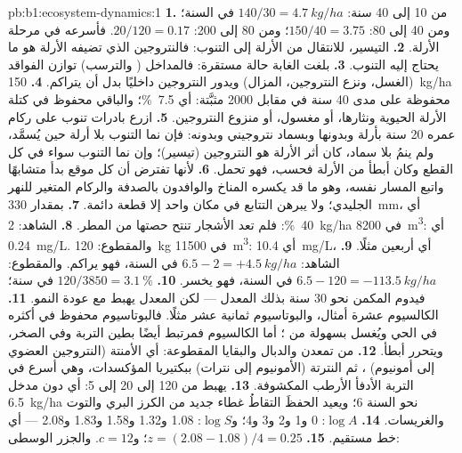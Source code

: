\begin{solution}{pb:b1:ecosystem-dynamics:1}
\textbf{1.} من 10 إلى 40 سنة: $140/30 = \qty{4.7}{kg/ha}$ في السنة؛ ومن 40 إلى 80:
$150/40 = \num{3.75}$؛ ومن 80 إلى 200: $20/120 = \num{0.17}$. فأسرعه في
مرحلة الأرلة.
\textbf{2.} التيسير، للانتقال من الأرلة إلى التنوب: فالنتروجين الذي
تضيفه الأرلة هو ما يحتاج إليه التنوب.
\textbf{3.} بلغت الغابة حالة مستقرة: فالمداخل (
والترسب) توازن الفواقد (الغسل، ونزع النتروجين، 
المزال) ويدور النتروجين داخليًا بدل أن يتراكم.
\textbf{4.} \qty{150}{kg/ha} محفوظة على مدى 40 سنة في مقابل
\num{2000} مثبَّتة: أي \qty{7.5}{\%}؛ والباقي محفوظ في كتلة الأرلة
الحيوية ونثارها، أو مغسول، أو منزوع النتروجين.
\textbf{5.} ازرع بادرات تنوب على ركام عمره 20 سنة بأرلة وبدونها
وبسماد نتروجيني وبدونه: فإن نما التنوب
بلا أرلة حين يُسمَّد، ولم ينمُ بلا سماد، كان
أثر الأرلة هو النتروجين (تيسير)؛ وإن نما التنوب سواء
في كل القطع وكان أبطأ من الأرلة فحسب، فهو تحمل.
\textbf{6.} لأنها تفترض أن كل موقع بدأ متشابهًا واتبع المسار
نفسه، وهو ما قد يكسره المناخ والوافدون بالصدفة والركام المتغير
للنهر الجليدي؛ ولا يبرهن التتابع في مكان واحد إلا قطعة دائمة.
\textbf{7.} بمقدار \qty{330}{mm}، أي \qty{40}{\%}: فلم تعد الأشجار
تنتح حصتها من المطر.
\textbf{8.} الشاهد: \qty{2}{kg/ha} في \qty{8200}{m^3}: أي \qty{0.24}{mg/L}.
والمقطوع: \qty{120}{kg} في \qty{11500}{m^3}: أي \qty{10.4}{mg/L}، أي أربعين
مثلًا.
\textbf{9.} الشاهد: $6.5 - 2 = +\qty{4.5}{kg/ha}$ في السنة، فهو يراكم.
والمقطوع: $6.5 - 120 = -\qty{113.5}{kg/ha}$ في السنة، فهو يخسر.
\textbf{10.} $120/3850 = \qty{3.1}{\%}$ في سنة؛ فيدوم المكمن
نحو \num{30} سنة بذلك المعدل --- لكن المعدل يهبط مع عودة
النمو.
\textbf{11.} الكالسيوم عشرة أمثال، والبوتاسيوم ثمانية عشر مثلًا. فالبوتاسيوم محفوظ
في أكثره في  الحي ويُغسل بسهولة من ؛ أما الكالسيوم
فمرتبط أيضًا بطين التربة وفي الصخر، ويتحرر أبطأ.
\textbf{12.} من تمعدن  والدبال والبقايا
المقطوعة: أي الأمنتة (النتروجين العضوي إلى أمونيوم) ، ثم
النترتة (الأمونيوم إلى نترات) ببكتيريا المؤكسدات، وهي أسرع في
التربة الأدفأ الأرطب المكشوفة.
\textbf{13.} يهبط من \num{120} إلى \num{20} إلى \num{5}: أي دون
مدخل \qty{6.5}{kg/ha} نحو السنة 6؛ ويعيد الحفظَ التقاطُ غطاء جديد من
الكرز البري والتوت والغريسات.
\textbf{14.} $\log A$: 0 و1 و2 و3 و4؛ و$\log S$: 1.08 و1.32 و1.58
و1.83 و2.08 --- أي خط مستقيم.
\textbf{15.} $z = (2.08 - 1.08)/4 = 0.25$؛ و$c = 12$. والجزر الوسطى:

\end{solution}
